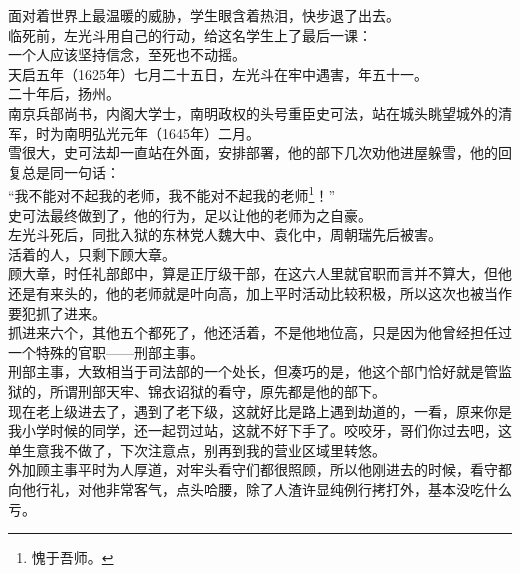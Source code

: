 \begin{multicols}{\theparacolNo}
面对着世界上最温暖的威胁，学生眼含着热泪，快步退了出去。\\

临死前，左光斗用自己的行动，给这名学生上了最后一课：\\

一个人应该坚持信念，至死也不动摇。\\

天启五年（1625年）七月二十五日，左光斗在牢中遇害，年五十一。\\

二十年后，扬州。\\

南京兵部尚书，内阁大学士，南明政权的头号重臣史可法，站在城头眺望城外的清军，时为南明弘光元年（1645年）二月。\\

雪很大，史可法却一直站在外面，安排部署，他的部下几次劝他进屋躲雪，他的回复总是同一句话：\\

“我不能对不起我的老师，我不能对不起我的老师\footnote{愧于吾师。}！”\\

史可法最终做到了，他的行为，足以让他的老师为之自豪。\\

左光斗死后，同批入狱的东林党人魏大中、袁化中，周朝瑞先后被害。\\

活着的人，只剩下顾大章。\\

顾大章，时任礼部郎中，算是正厅级干部，在这六人里就官职而言并不算大，但他还是有来头的，他的老师就是叶向高，加上平时活动比较积极，所以这次也被当作要犯抓了进来。\\

抓进来六个，其他五个都死了，他还活着，不是他地位高，只是因为他曾经担任过一个特殊的官职——刑部主事。\\

刑部主事，大致相当于司法部的一个处长，但凑巧的是，他这个部门恰好就是管监狱的，所谓刑部天牢、锦衣诏狱的看守，原先都是他的部下。\\

现在老上级进去了，遇到了老下级，这就好比是路上遇到劫道的，一看，原来你是我小学时候的同学，还一起罚过站，这就不好下手了。咬咬牙，哥们你过去吧，这单生意我不做了，下次注意点，别再到我的营业区域里转悠。\\

外加顾主事平时为人厚道，对牢头看守们都很照顾，所以他刚进去的时候，看守都向他行礼，对他非常客气，点头哈腰，除了人渣许显纯例行拷打外，基本没吃什么亏。\\


\end{multicols}
